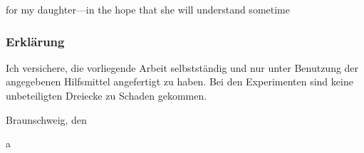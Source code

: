 \documentclass[
	a4paper,
	abstracton,
	english,
  ngerman,
	twoside
] {scrreprt}
\author{\docauthor}
\date{\today~(DRAFT)}
\title{\doctitle}
\renewcommand{\docdate}{2013-07-11}
\theoremstyle{break}
\theoremstyle{nonumberbreak}
\theoremstyle{empty}
\numberwithin{case}{proof}
\newcommand{\includeChapter}[1]{\glsresetall\cleardoublepage}
\begin{document}
\isodate
{}

\maketitle
{}

\thispagestyle{empty}
\vspace*{\fill}
\hspace*{\fill}
for my daughter---in the hope that she will understand sometime
\cleardoublepage

\subsubsection*{\centering Erklärung}
Ich versichere, die vorliegende Arbeit selbstständig und nur unter
Benutzung der angegebenen Hilfsmittel angefertigt zu haben. Bei den
Experimenten sind keine unbeteiligten Dreiecke zu Schaden gekommen.

\vspace{2em}

Braunschweig, den {\origdate\printdate{\docdate}}
\vspace{5em}
\cleardoublepage

\begin{minipage}{\textwidth}
	\begin{abstract}
	Maxmin length triangulations are just awesome.
	\end{abstract}

	\begin{abstract}
	Maxmin Triangulationen sind einfach super.
	\end{abstract}
\end{minipage}
\thispagestyle{plain}
\cleardoublepage

\tableofcontents
\cleardoublepage

\cleardoublepage
\setcounter{page}{1}

\includeChapter{introduction}
\includeChapter{integer_programming}
\includeChapter{triangulations}
\includeChapter{mmlt}
\includeChapter{implementation}
\includeChapter{results}
\includeChapter{conclusion}

\begin{appendix}
  
  a
\end{appendix}

\printglossary[style=listdotted,type=main]
\printglossary[style=listdotted,type=prop]
\printglossary[style=listdotted,type=set]

\printbibliography
\cleardoublepage

\listoftodos
\end{document}
